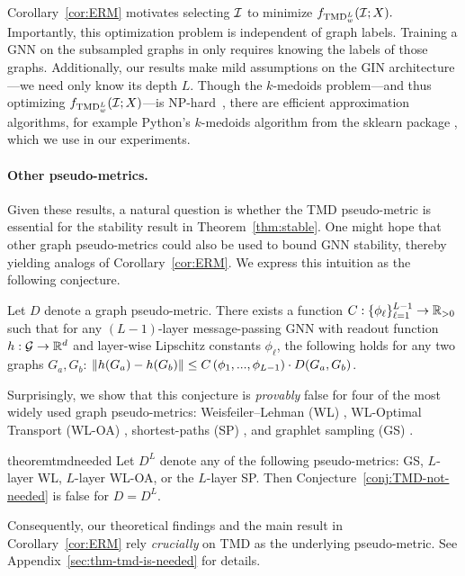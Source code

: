 Corollary~\ref{cor:ERM} motivates selecting $\mathcal I$ to minimize $f_{\textnormal{TMD}_w^L}(\mathcal I; X).$
Importantly, this optimization problem is independent of graph labels. Training a GNN on the subsampled graphs in only requires knowing the labels of those graphs. Additionally, our results make mild assumptions on the GIN architecture---we need only know its depth $L$. Though the $k$-medoids problem---and thus optimizing $f_{\textnormal{TMD}_w^L}(\mathcal I; X)$---is NP-hard~\citep{kazakovtsev2020application}, {there are} efficient approximation algorithms, for example Python's $k$-medoids algorithm from the sklearn package \citep{sklearn_api}, which we use in our experiments.

\paragraph{Other pseudo-metrics.} Given these results, a natural question is whether the TMD pseudo-metric is essential for the stability result in Theorem~\ref{thm:stable}. One might hope that other graph pseudo-metrics could also be used to bound GNN stability, thereby yielding analogs of Corollary~\ref{cor:ERM}.  We express this intuition as the following conjecture.

\begin{conjecture}\label{conj:TMD-not-needed} Let $D$ denote a graph pseudo-metric. There exists a function $C : \{\phi_\ell\}_{\ell=1}^{L-1} \to \mathbb R_{> 0}$ such that for any $(L-1)$-layer message-passing GNN with readout function $h: \mathcal G \to \mathbb R^d$ and layer-wise Lipschitz constants $\phi_\ell$, the following holds for any two graphs $G_a, G_b$: $\left\lVert h(G_a) - h(G_b)\right\rVert \leq C\left(\phi_1, ..., \phi_{L-1} \right ) \cdot D(G_a, G_b)$. 
\end{conjecture}

Surprisingly, we show that this conjecture is \emph{provably} false for four of the most widely used graph pseudo-metrics: Weisfeiler–Lehman (WL) \citep{shervashidze2011weisfeiler}, WL-Optimal Transport (WL-OA) \citep{kriege2016valid}, shortest-paths (SP) \citep{borgwardt2005shortest}, and graphlet sampling (GS) \citep{shervashidze2009efficient}. 

\begin{restatable}{theorem}{tmdneeded}\label{thm:TMD-is-needed}
    Let $D^L$ denote any of the following pseudo-metrics: GS, $L$-layer WL, $L$-layer WL-OA, or the $L$-layer SP. Then Conjecture~\ref{conj:TMD-not-needed} is false for $D = D^L$.
\end{restatable}

Consequently, our theoretical findings and the main result in Corollary~\ref{cor:ERM} rely \emph{crucially} on TMD as the underlying pseudo-metric. See Appendix~\ref{sec:thm-tmd-is-needed} for details.